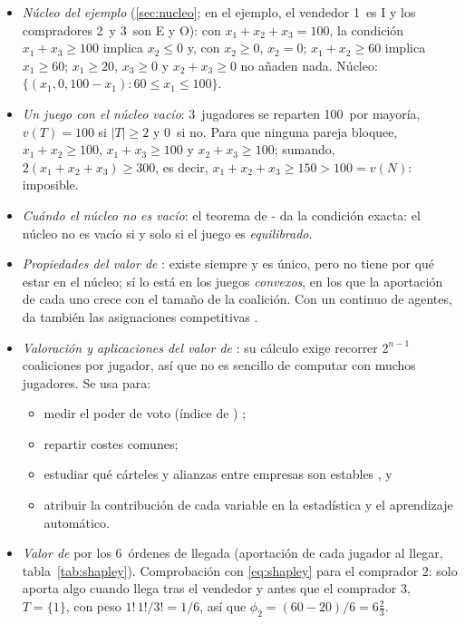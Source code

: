 \documentclass[11pt]{article}
\begin{document}
\begin{itemize}
\item \emph{Núcleo del ejemplo} (\ref{sec:nucleo}; en el ejemplo, el vendedor 1~es \textup{I} y los compradores 2~y 3~son E y O): con $x_1+x_2+x_3=100$, la condición $x_1+x_3\geq100$ implica $x_2\leq0$ y, con $x_2\geq0$, $x_2=0$; $x_1+x_2\geq60$ implica $x_1\geq60$; $x_1\geq20$, $x_3\geq0$ y $x_2+x_3\geq0$ no añaden nada. Núcleo: $\big\{(x_1,0,100-x_1):60\leq x_1\leq100\big\}$.\findemo
\item \emph{Un juego con el núcleo vacío}: 3~jugadores se reparten 100~por mayoría, $v(T)=100$ si $|T|\geq2$ y 0~si no. Para que ninguna pareja bloquee, $x_1+x_2\geq100$, $x_1+x_3\geq100$ y $x_2+x_3\geq100$; sumando, $2(x_1+x_2+x_3)\geq300$, es decir, $x_1+x_2+x_3\geq150>100=v(N)$: imposible.\findemo
\item \emph{Cuándo el núcleo no es vacío}: el teorema de - da la condición exacta: el núcleo no es vacío si y solo si el juego es \emph{equilibrado}\nocite{Bondareva1963Some,Shapley1967Balanced}.
\item \emph{Propiedades del valor de }: existe siempre y es único, pero no tiene por qué estar en el núcleo; sí lo está en los juegos \emph{convexos}, en los que la aportación de cada uno crece con el tamaño de la coalición\nocite{Shapley1971Cores}. Con un continuo de agentes, da también las asignaciones competitivas\nocite{Aumann1975Values} .
\item \emph{Valoración y aplicaciones del valor de }: su cálculo exige recorrer $2^{n-1}$ coaliciones por jugador, así que no es sencillo de computar con muchos jugadores. Se usa para:
  \begin{itemize}
  \item medir el poder de voto (índice de \textcite{ShapleyShubik1954Method}) ;
  \item repartir costes comunes;
  \item estudiar qué cárteles y alianzas entre empresas son estables , y
  \item atribuir la contribución de cada variable en la estadística y el aprendizaje automático.
  \end{itemize}
\item \emph{Valor de } por los 6~órdenes de llegada (aportación de cada jugador al llegar, tabla~\ref{tab:shapley}). Comprobación con \eqref{eq:shapley} para el comprador 2: solo aporta algo cuando llega tras el vendedor y antes que el comprador 3, $T=\{1\}$, con peso $1!\,1!/3!=1/6$, así que $\phi_2=(60-20)/6=6\tfrac23$.
\end{itemize}
\end{document}
